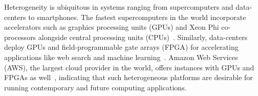 






%

Heterogeneity is ubiquitous in systems ranging from supercomputers and data-centers
to smartphones. The fastest supercomputers in the world incorporate accelerators 
such as graphics processing units (GPUs) and Xeon Phi co-processors alongside central processing units
(CPUs)~\cite{top500nov}. Similarly, data-centers deploy GPUs and field-programmable
gate arrays (FPGA) for accelerating applications like  web search and machine
learning~\cite{catapultmicrosoft}. Amazon Web Services (AWS), the largest cloud
provider in the world, offers instances with GPUs and FPGAs as well~\cite{awsinstances}, indicating that such
heterogeneous platforms are desirable for running contemporary and future
computing applications.


